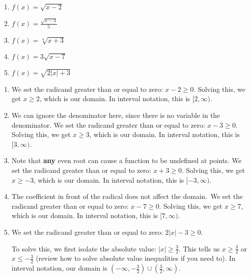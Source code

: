 \documentclass{ximera}
\begin{document}
\begin{enumerate}
	\item$f(x) = \sqrt{x - 2}$
	\item $f(x) = \frac{\sqrt{x - 3}}{5}$
	\item $f(x) = \sqrt[4]{x + 3}$
	\item $f(x) = 3\sqrt{x - 7}$
	\item $f(x) = \sqrt{2|x| + 3}$
\end{enumerate}

\begin{explanation}
\begin{enumerate}
	\item We set the radicand greater than or equal to zero: $x - 2 \ge 0$. Solving this, we get $x \ge 2$, which is our domain. In interval notation, this is $[2, \infty)$. 

	\item We can ignore the denominator here, since there is no variable in the denominator. We set the radicand greater than or equal to zero: $x - 3 \ge 0$. Solving this, we get $x \ge 3$, which is our domain. In interval notation, this is $[3, \infty)$. 
	\item Note that \textbf{any} even root can cause a function to be undefined at points. We set the radicand greater than or equal to zero: $x + 3 \ge 0$. Solving this, we get $x \ge -3$, which is our domain. In interval notation, this is $[-3, \infty)$.  

	\item The coefficient in front of the radical does not affect the domain. We set the radicand greater than or equal to zero: $x -7 \ge 0$. Solving this, we get $x \ge 7$, which is our domain. In interval notation, this is $[7, \infty)$. 

	\item We set the radicand greater than or equal to zero: $2|x| - 3 \ge 0$.

To solve this, we first isolate the absolute value: $|x| \ge \frac{3}{2}$. This tells us $x \ge \frac{3}{2}$ or $x \le -\frac{3}{2}$ (review how to solve absolute value inequalities if you need to). In interval notation, our domain is $\left(-\infty, -\frac{3}{2}\right) \cup \left(\frac{3}{2}, \infty\right)$.
\end{enumerate}
\end{explanation}
\end{document}
